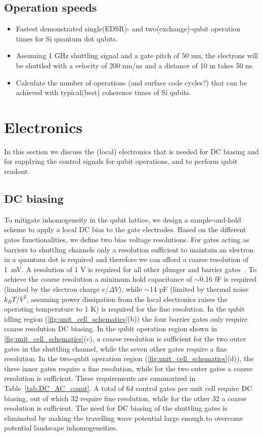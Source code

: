 \documentclass[aps,prl,reprint,superscriptaddress,floatfix]{revtex4-1}
\begin{document}
\subsection{Operation speeds}
\begin{itemize}
\item Fastest demonstrated  single(EDSR)- and two(exchange)-qubit operation times for Si quantum dot qubits.
\item Assuming 1 GHz shuttling signal and a gate pitch of 50 nm, the electrons will be shuttled with a velocity of 200 nm/ns and a distance of 10 \textmu m takes 50 ns.
\item Calculate the number of operations (and surface code cycles?) that can be achieved with typical(best) coherence times of Si qubits. 
\end{itemize}

\section{Electronics}\label{sec:electronics}
In this section we discuss the (local) electronics that is needed for DC biasing and for supplying the control signals for qubit operations, and to perform qubit readout.

\subsection{DC biasing}
To mitigate inhomogeneity in the qubit lattice, we design a sample-and-hold scheme to apply a local DC bias to the gate electrodes.
Based on the different gates functionalities, we define two bias voltage resolutions.
For gates acting as barriers to shuttling channels only a resolution sufficient to maintain an electron in a quantum dot is required and therefore we can afford a coarse resolution of 1~mV.
A resolution of 1 \textmu V is required for all other plunger and barrier gates~\cite{Vandersypen2017}.
To achieve the coarse resolution a minimum hold capacitance of $\sim$0.16 fF is required (limited by the electron charge $e/\Delta V$), while $\sim$14 pF (limited by thermal noise $k_B T/V^2$, assuming power dissipation from the local electronics raises the operating temperature to 1 K) is required for the fine resolution.
In the qubit idling region (\autoref{fig:unit_cell_schematics}(b)) the four barrier gates only require coarse resolution DC biasing.
In the qubit operation region shown in \autoref{fig:unit_cell_schematics}(c), a coarse resolution is sufficient for the two outer gates in the shuttling channel, while the seven other gates require a fine resolution.
In the two-qubit operation region (\autoref{fig:unit_cell_schematics}(d)), the three inner gates require a fine resolution, while for the two outer gates a coarse resolution is sufficient.
These requirements are summarized in Table~\ref{tab:DC_AC_count}.
A total of 64 control gates per unit cell require DC biasing, out of which 32 require fine resolution, while for the other 32 a coarse resolution is sufficient.
The need for DC biasing of the shuttling gates is eliminated by making the travelling wave potential large enough to overcome potential landscape inhomogeneities.
\end{document}
